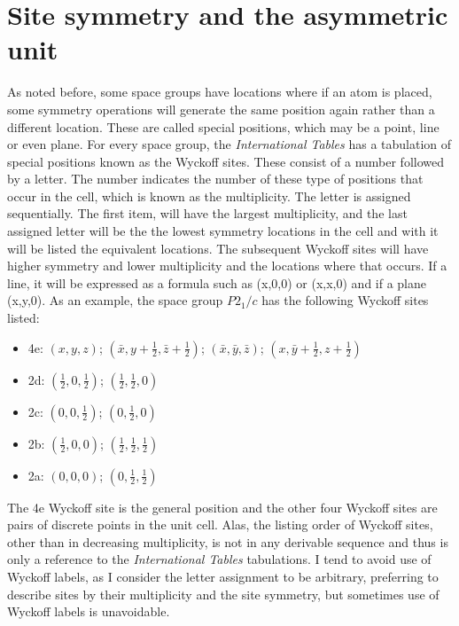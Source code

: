  \section{Site symmetry and the asymmetric unit}\label{ref:asymmetricunit}
As noted before, some space groups have locations where if an atom is placed, some symmetry operations will generate the same position again rather than a different location. These are called special positions, which may be a point, line or even plane. For every space group, the \textit{International Tables} has a tabulation of special positions known as the Wyckoff sites. These consist of a number followed by a letter. The number indicates the number of these type of positions that occur in the cell, which is known as the multiplicity. The letter is assigned sequentially. The first item, will have the largest multiplicity, and the last assigned letter will be the the lowest symmetry locations in the cell and with it will be listed the equivalent locations. The subsequent Wyckoff sites will have higher symmetry and lower multiplicity and the locations where that occurs. If a line, it will be expressed as a formula such as (x,0,0) or (x,x,0) and if a plane (x,y,0). 
As an example, the space group $P 2_1/c$ has the following Wyckoff sites listed:

\begin{itemize}
    \item 4e:  $(x, y, z)$; $(\bar{x}, y+\frac{1}{2}, \bar{z}+\frac{1}{2})$; $(\bar{x}, \bar{y}, \bar{z})$; $(x, \bar{y}+\frac{1}{2}, z+\frac{1}{2})$
    \item 2d: $(\frac{1}{2}, 0, \frac{1}{2})$; $(\frac{1}{2}, \frac{1}{2}, 0)$
    \item 2c: $(0, 0, \frac{1}{2})$; $(0, \frac{1}{2}, 0)$
    \item 2b: $(\frac{1}{2}, 0, 0)$; $(\frac{1}{2}, \frac{1}{2}, \frac{1}{2})$
    \item 2a: $(0, 0, 0)$; $(0, \frac{1}{2}, \frac{1}{2})$ 
\end{itemize}
The 4e Wyckoff site is the general position and the other four Wyckoff sites are pairs of discrete points in the unit cell. Alas, the listing order of Wyckoff sites, other than in decreasing multiplicity, is not in any derivable sequence and thus is only a reference to the \textit{International Tables} tabulations. I tend to avoid use of Wyckoff labels, as I consider the letter assignment to be arbitrary, preferring to describe sites by their multiplicity and the site symmetry, but sometimes use of Wyckoff labels is unavoidable. 


